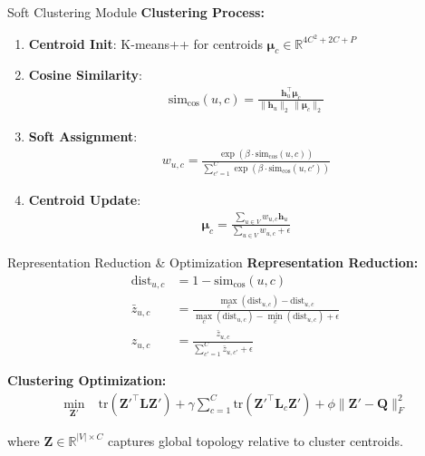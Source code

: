\documentclass{beamer}
\begin{document}
\begin{frame}{Soft Clustering Module}
    \textbf{Clustering Process:}
    \begin{enumerate}
        \item \textbf{Centroid Init}: K-means++ for centroids $\boldsymbol{\mu}_c \in \mathbb{R}^{4C^2 + 2C + P}$
        \item \textbf{Cosine Similarity}: 
        \begin{align}
        \text{sim}_{\cos}(u, c) = \frac{\mathbf{h}_u^{\top} \boldsymbol{\mu}_c}{\|\mathbf{h}_u\|_2 \, \|\boldsymbol{\mu}_c\|_2}
        \end{align}
        \item \textbf{Soft Assignment}: 
        \begin{align}
        w_{u,c} = \frac{\exp(\beta \cdot \text{sim}_{\cos}(u, c))}{\sum_{c'=1}^{C} \exp(\beta \cdot \text{sim}_{\cos}(u, c'))}
        \end{align}
        \item \textbf{Centroid Update}: 
        \begin{align}
        \boldsymbol{\mu}_c = \frac{\sum_{u \in V} w_{u,c} \mathbf{h}_u}{\sum_{u \in V} w_{u,c} + \epsilon}
        \end{align}
    \end{enumerate}
\end{frame}

\begin{frame}{Representation Reduction \& Optimization}
    \textbf{Representation Reduction:}
    \begin{align}
    \text{dist}_{u,c} &= 1 - \text{sim}_{\cos}(u, c) \\
    \bar{z}_{u,c} &= \frac{\max_c(\text{dist}_{u,c}) - \text{dist}_{u,c}}{\max_c(\text{dist}_{u,c}) - \min_c(\text{dist}_{u,c}) + \epsilon} \\
    z_{u,c} &= \frac{\bar{z}_{u,c}}{\sum_{c'=1}^{C} \bar{z}_{u,c'} + \epsilon}
    \end{align}
    
    \textbf{Clustering Optimization:}
    \begin{align}
    \min_{\mathbf{Z}'} &\; \text{tr}(\mathbf{Z}'^{\top} \mathbf{L} \mathbf{Z}') + \gamma \sum_{c=1}^C \text{tr}(\mathbf{Z}'^{\top} \mathbf{L}_c \mathbf{Z}') + \phi \|\mathbf{Z}' - \mathbf{Q}\|_F^2
    \end{align}
    
    where $\mathbf{Z} \in \mathbb{R}^{|V| \times C}$ captures global topology relative to cluster centroids.
\end{frame}
\end{document}
